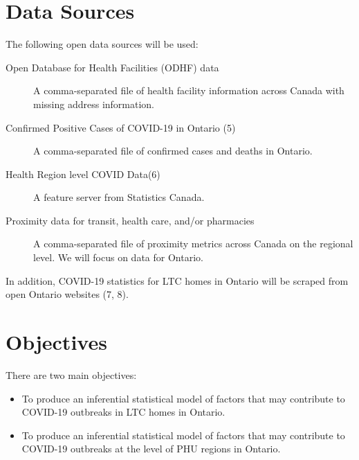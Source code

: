 \documentclass{article}
\begin{document}

\section{Data Sources}

The following open data sources will be used:

\begin{description}

\item[Open Database for Health Facilities (ODHF) data]
A comma-separated file of health facility information across Canada with missing address information.

\item[Confirmed Positive Cases of COVID-19 in Ontario (5)]
A comma-separated file of confirmed cases and deaths in Ontario.

\item[Health Region level COVID Data(6)]
A feature server from Statistics Canada.

\item[Proximity data for transit, health care, and/or pharmacies]
A comma-separated file of proximity metrics across Canada on the regional level. We will focus on data for Ontario.

\end{description} 

In addition, COVID-19 statistics for LTC homes in Ontario will be scraped from open Ontario websites (7, 8).

  

\section{Objectives}

There are two main objectives:

\begin{center}
\begin{itemize}
\item To produce an inferential statistical model of factors that may contribute to COVID-19 outbreaks in LTC homes in Ontario. 

\item To produce an inferential statistical model of factors that may contribute to COVID-19 outbreaks at the level of PHU regions in Ontario.
\end{itemize}
\end{center}
\end{document}

